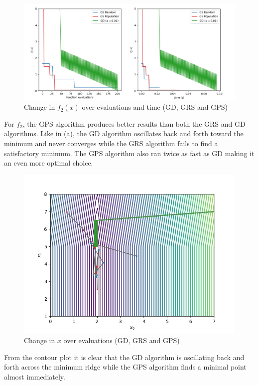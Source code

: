 \documentclass[12pt]{article}
\begin{document}
\begin{figure}[h]
    \centering
    \includegraphics[scale=0.55]{figs/ab/b_ii_2.png}
    \caption{Change in $f_2(x)$ over evaluations and time (GD, GRS and GPS)}
    \label{fig:b_ii_2}
\end{figure}

For $f_2$, the GPS algorithm produces better results than both the GRS and GD algorithms. Like in (a), the GD algorithm oscillates back and forth toward the minimum and never converges while the GRS algorithm fails to find a satisfactory minimum. The GPS algorithm also ran twice as fast as GD making it an even more optimal choice.

\begin{figure}[h]
    \centering
    \includegraphics[scale=0.55]{figs/ab/b_ii_2_cont.png}
    \caption{Change in $x$ over evaluations (GD, GRS and GPS)}
    \label{fig:b_ii_2_cont}
\end{figure}

From the contour plot it is clear that the GD algorithm is oscillating back and forth across the minimum ridge while the GPS algorithm finds a minimal point almost immediately.
\end{document}
